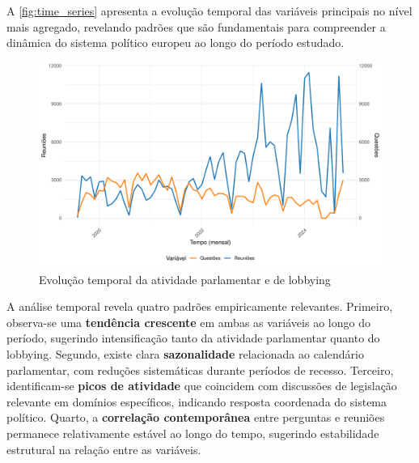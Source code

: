 A \autoref{fig:time_series} apresenta a evolução temporal das variáveis principais no nível mais agregado, revelando padrões que são fundamentais para compreender a dinâmica do sistema político europeu ao longo do período estudado.

\begin{figure}[htbp]
\centering
\includegraphics[width=\textwidth]{figures/descriptive_plots/fig1_time_series_meetings_questions.pdf}
\caption{Evolução temporal da atividade parlamentar e de lobbying}
\label{fig:time_series}
\end{figure}

A análise temporal revela quatro padrões empiricamente relevantes. Primeiro, observa-se uma \textbf{tendência crescente} em ambas as variáveis ao longo do período, sugerindo intensificação tanto da atividade parlamentar quanto do lobbying. Segundo, existe clara \textbf{sazonalidade} relacionada ao calendário parlamentar, com reduções sistemáticas durante períodos de recesso. Terceiro, identificam-se \textbf{picos de atividade} que coincidem com discussões de legislação relevante em domínios específicos, indicando resposta coordenada do sistema político. Quarto, a \textbf{correlação contemporânea} entre perguntas e reuniões permanece relativamente estável ao longo do tempo, sugerindo estabilidade estrutural na relação entre as variáveis.



